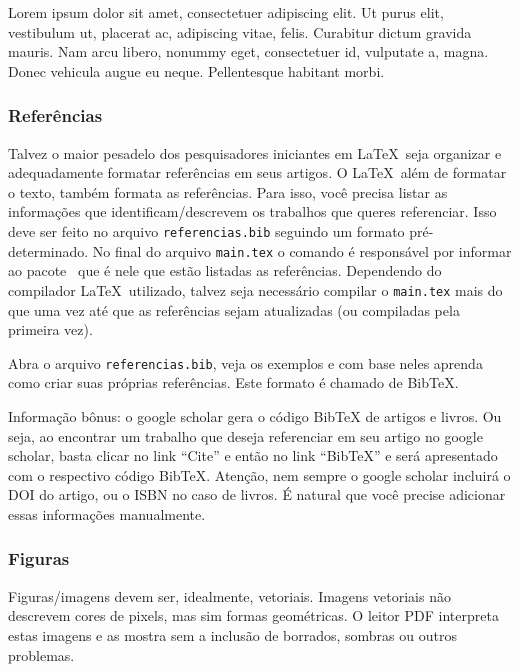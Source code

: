 \begin{citacao}
	Lorem ipsum dolor sit amet, consectetuer adipiscing elit. Ut purus elit, vestibulum ut, placerat ac, adipiscing vitae, felis. Curabitur dictum gravida mauris. Nam arcu libero, nonummy eget, consectetuer id, vulputate a, magna. Donec vehicula augue eu neque. Pellentesque habitant morbi.
 \end{citacao}

\subsubsection{Referências}

Talvez o maior pesadelo dos pesquisadores iniciantes em \LaTeX\ seja organizar e adequadamente formatar referências em seus artigos. O \LaTeX\ além de formatar o texto, também formata as referências. Para isso, você precisa listar as informações que identificam/descrevem os trabalhos que queres referenciar. Isso deve ser feito no arquivo \texttt{referencias.bib} seguindo um formato pré-determinado. No final do arquivo \texttt{main.tex} o comando \verb|| é responsável por informar ao pacote \abnTeX\ que é nele que estão listadas as referências. Dependendo do compilador \LaTeX\ utilizado, talvez seja necessário compilar o \texttt{main.tex} mais do que uma vez até que as referências sejam atualizadas (ou compiladas pela primeira vez).

Abra o arquivo \texttt{referencias.bib}, veja os exemplos e com base neles aprenda como criar suas próprias referências. Este formato é chamado de BibTeX.

Informação bônus: o google scholar gera o código BibTeX de artigos e livros. Ou seja, ao encontrar um trabalho que deseja referenciar em seu artigo no google scholar, basta clicar no link ``Cite'' e então no link ``BibTeX'' e será apresentado com o respectivo código BibTeX. Atenção, nem sempre o google scholar incluirá o DOI do artigo, ou o ISBN no caso de livros. É natural que você precise adicionar essas informações manualmente.

\subsubsection{Figuras}

Figuras/imagens devem ser, idealmente, vetoriais. Imagens vetoriais não descrevem cores de pixels, mas sim formas geométricas. O leitor PDF interpreta estas imagens e as mostra sem a inclusão de borrados, sombras ou outros problemas. 

